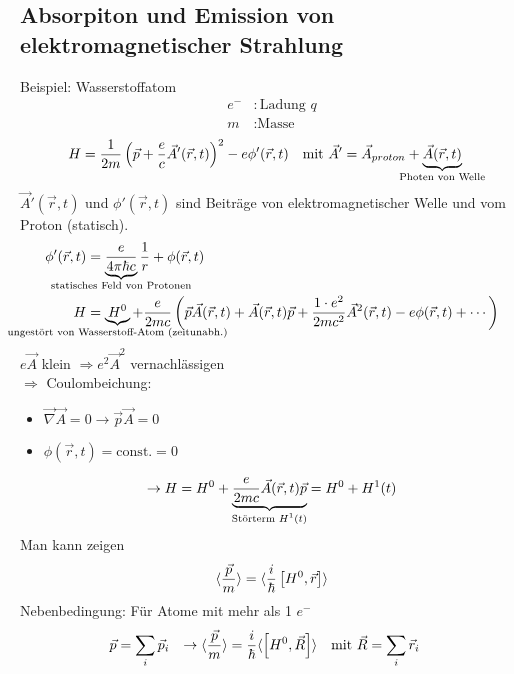 \subsection{Absorpiton und Emission von elektromagnetischer Strahlung}
	Beispiel: Wasserstoffatom
		\begin{align*}
		e^- &: \text{Ladung~} q \\
		m &: \text{Masse}
		\end{align*}
		\begin{align*}
			H &= \frac{1}{2m} \left( \vec{p} + \frac{e}{c} \vec{A}' (\vec{r} , t)\right)^2
			- e \phi' (\vec{r} , t) 
			&\text{mit~} \vec{A}' &= \vec{A}_{proton} + \underbrace{\vec{A} (\vec{r} , t)}_{\mathclap{\text{Photen von Welle}}}		
		\end{align*}
	$\vec{A}' (\vec{r} , t)$ und $\phi' (\vec{r} , t)$ sind Beiträge von elektromagnetischer Welle und vom Proton (statisch). 
		\begin{align*}
			\phi' (\vec{r} , t) &= \underbrace{\frac{e}{4 \pi \hbar c}}_{\mathclap{\text{statisches Feld von Protonen}}}
			\frac{1}{r} + \phi (\vec{r} , t) \\
			H &= \underbrace{H^0}_{\mathclap{\text{ungestört von Wasserstoff-Atom (zeitunabh.)}}}
			+ \frac{e}{2 m c} \left( \vec{p} \vec{A} (\vec{r} , t) + \vec{A} (\vec{r} , t) \vec{p} + \frac{1 \cdot e^2}{2 m c^2} \vec{A}^2 (\vec{r} , t) - e\phi (\vec{r} , t) + \cdots 
			\right)
		\end{align*} 
	$e \vec{A}$ klein $\Rightarrow e^2 \vec{A}^2$ vernachlässigen \\
	$\Rightarrow$ Coulombeichung:
		\begin{itemize}
			\item $\vec{\nabla} \vec{A} = 0 \rightarrow \vec{p} \vec{A} = 0$ 
			\item $\phi (\vec{r}, t) = \text{const.} = 0$
		\end{itemize}
		\begin{equation*}
			\rightarrow H = H^0 +
			\underbrace{\frac{e}{2 m c} \vec{A} (\vec{r} , t) \vec{p}}_{\mathclap{\text{Störterm~} H^1(t)}} 
			= H^0 + H^1(t)
		\end{equation*}
	Man kann zeigen 
		\begin{equation*}
			\langle {\frac{\vec{p}}{m}} \rangle = \langle {\frac{i}{\hbar} \left[H^0 , \vec{r}\right]} \rangle
		\end{equation*}
	Nebenbedingung: Für Atome mit mehr als 1 $e^-$
		\begin{align*}
			\vec{p} &= \sum_i \vec{p}_i 
			&\rightarrow \langle {\frac{\vec{p}}{m}} \rangle &= \frac{i}{\hbar} \langle {\left[H^0 , \vec{R}\right]} \rangle
			&\text{mit~} \vec{R} &= \sum_i \vec{r}_i
		\end{align*}
